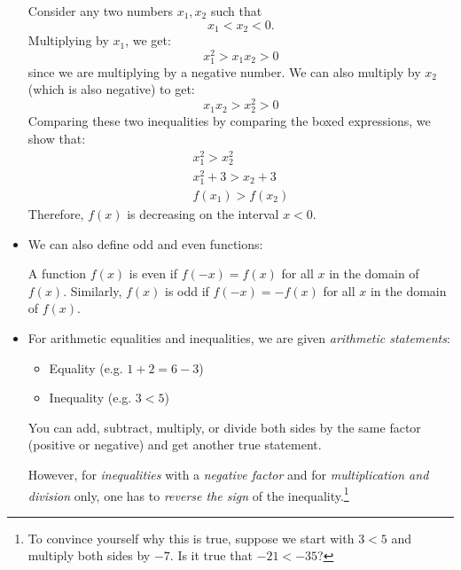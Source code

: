 \begin{itemize}
\begin{example}
        Consider any two numbers $x_1, x_2$ such that \begin{equation}
            x_1<x_2<0.
        \end{equation}
        Multiplying by $x_1$, we get:
        \begin{equation}
            x_1^2>\boxed{x_1x_2}>0
            \label{eq:}
        \end{equation}
        since we are multiplying by a negative number. We can also multiply by $x_2$ (which is also negative) to get:
        \begin{equation}
            \boxed{x_1x_2}>x_2^2>0
            \label{eq:}
        \end{equation}
        Comparing these two inequalities by comparing the boxed expressions, we show that:
        \begin{align}
            x_1^2>x_2^2 \\ 
            x_1^2+3>x_2+3 \\ 
            f(x_1) > f(x_2)
            \label{eq:}
        \end{align}
        Therefore, $f(x)$ is decreasing on the interval $x<0$.
    \end{example}
    \item We can also define odd and even functions:
    \begin{definition}
        A function $f(x)$ is even if $f(-x)=f(x)$ for all $x$ in the domain of $f(x)$. Similarly, $f(x)$ is odd if $f(-x)=-f(x)$ for all $x$ in the domain of $f(x)$.
    \end{definition}
    \item For arithmetic equalities and inequalities, we are given \textit{arithmetic statements}:
    \begin{itemize}
        \item Equality (e.g. $1+2=6-3$)
        \item Inequality (e.g. $3<5$)
    \end{itemize}
    \begin{theorem}
        You can add, subtract, multiply, or divide both sides by the same factor (positive or negative) and get another true statement.
        \vspace{2mm}

        However, for \emph{inequalities} with a \emph{negative factor} and for \emph{multiplication and division} only, one has to \textit{reverse the sign} of the inequality.\footnote{To convince yourself why this is true, suppose we start with $3<5$ and multiply both sides by $-7$. Is it true that $-21<-35$?}
    \end{theorem}
\end{itemize}